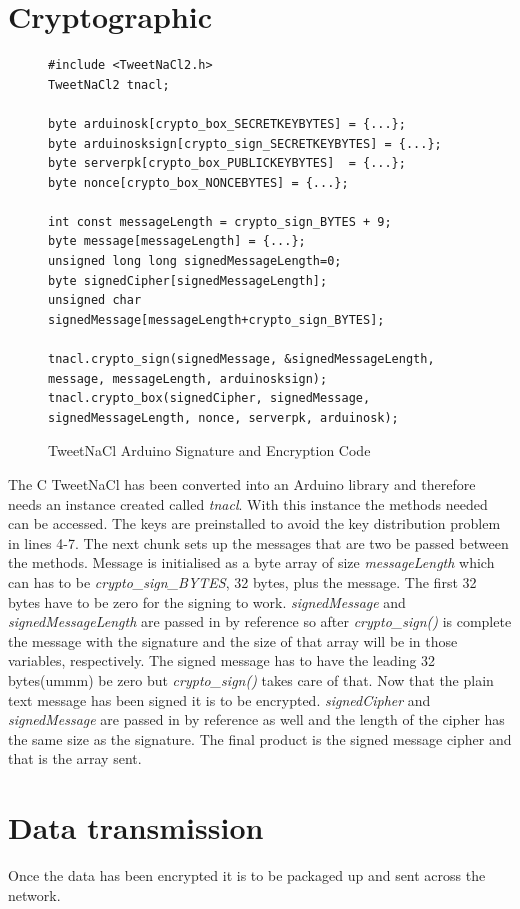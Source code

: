 \section{Cryptographic}
\begin{figure}[H]
\begin{lstlisting}[style=Arduino]
#include <TweetNaCl2.h>
TweetNaCl2 tnacl;

byte arduinosk[crypto_box_SECRETKEYBYTES] = {...};
byte arduinosksign[crypto_sign_SECRETKEYBYTES] = {...};
byte serverpk[crypto_box_PUBLICKEYBYTES]  = {...};
byte nonce[crypto_box_NONCEBYTES] = {...};

int const messageLength = crypto_sign_BYTES + 9;
byte message[messageLength] = {...};
unsigned long long signedMessageLength=0;
byte signedCipher[signedMessageLength];
unsigned char signedMessage[messageLength+crypto_sign_BYTES];

tnacl.crypto_sign(signedMessage, &signedMessageLength, message, messageLength, arduinosksign);
tnacl.crypto_box(signedCipher, signedMessage, signedMessageLength, nonce, serverpk, arduinosk);
\end{lstlisting}
\caption{TweetNaCl Arduino Signature and Encryption Code}
\label{snip:nacl}
\end{figure}

The C TweetNaCl has been converted into an Arduino library and therefore needs an instance created called \emph{tnacl}. With this instance the methods needed can be accessed. The keys are preinstalled to avoid the key distribution problem in lines 4-7. The next chunk sets up the messages that are two be passed between the methods. Message is initialised as a byte array of size \emph{messageLength} which can has to be \emph{crypto\_sign\_BYTES}, 32 bytes, plus the message. The first 32 bytes have to be zero for the signing to work. \emph{signedMessage} and \emph{signedMessageLength} are passed in by reference so after \emph{crypto\_sign()} is complete the message with the signature and the size of that array will be in those variables, respectively. The signed message has to have the leading 32 bytes(ummm) be zero but \emph{crypto\_sign()} takes care of that. Now that the plain text message has been signed it is to be encrypted. \emph{signedCipher} and \emph{signedMessage} are passed in by reference as well and the length of the cipher has the same size as the signature. The final product is the signed message cipher and that is the array sent.

\section{Data transmission}
Once the data has been encrypted it is to be packaged up and sent across the network.

